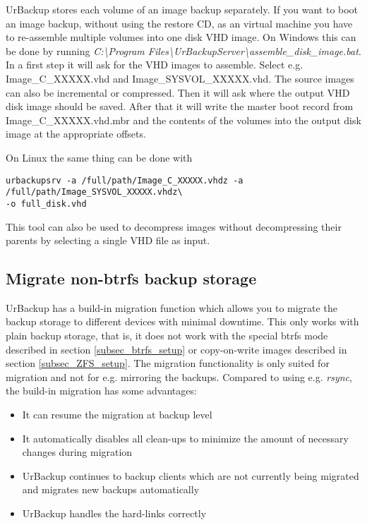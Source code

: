 \documentclass[a4paper,10pt]{article}
\begin{document}
UrBackup stores each volume of an image backup separately. If you want to boot an image backup, without using
the restore CD, as an virtual machine you have to re-assemble multiple volumes into one disk VHD image. On Windows
this can be done by running \textsl{C:\textbackslash Program Files\textbackslash UrBackupServer\textbackslash assemble\_disk\_image.bat}.
In a first step it will ask for the VHD images to assemble. Select e.g. Image\_C\_XXXXX.vhd and Image\_SYSVOL\_XXXXX.vhd. The source images can also be incremental or compressed. Then it will ask where the output VHD disk image should be saved. After that it will write the master boot record from Image\_C\_XXXXX.vhd.mbr and the contents of the volumes into the output disk image at the appropriate offsets.


\noindent On Linux the same thing can be done with
\begin{verbatim}
urbackupsrv -a /full/path/Image_C_XXXXX.vhdz -a /full/path/Image_SYSVOL_XXXXX.vhdz\ 
-o full_disk.vhd
\end{verbatim}

\noindent This tool can also be used to decompress images without decompressing their parents by selecting a single VHD file as input.

\subsection{Migrate non-btrfs backup storage}

UrBackup has a build-in migration function which allows you to migrate the backup storage to different devices with minimal downtime. This only works with plain backup storage, that is, it does not work with the special btrfs mode described in section \ref{subsec_btrfs_setup} or copy-on-write images described in section \ref{subsec_ZFS_setup}. The migration functionality is only suited for migration and not for e.g. mirroring the backups. Compared to using e.g. \textsl{rsync}, the build-in migration has some advantages:

\begin{itemize}
  \item It can resume the migration at backup level
  \item It automatically disables all clean-ups to minimize the amount of necessary changes during migration
  \item UrBackup continues to backup clients which are not currently being migrated and migrates new backups automatically
  \item UrBackup handles the hard-links correctly
\end{itemize}
\end{document}
